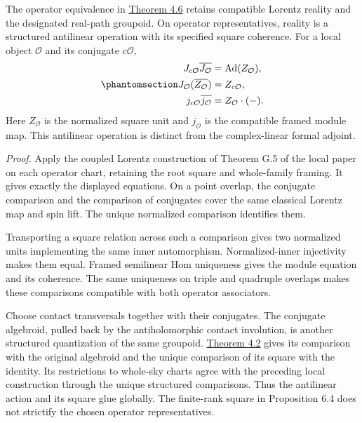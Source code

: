\documentclass[
  english,
  11pt,
  reqno]{amsart}
\begin{document}
The operator equivalence in
\hyperref[thm:operator-monodromy-equivalence]{Theorem 4.6} retains
compatible Lorentz reality and the designated real-path groupoid. On
operator representatives, reality is a structured antilinear operation
with its specified square coherence. For a local object \(\mathcal O\)
and its conjugate \(c\mathcal O\),
\begin{equation}\protect\phantomsection\label{eq:operator-monodromy-real-square}{
\begin{aligned}
J_{c\mathcal O}\overline{J_{\mathcal O}}
&=\operatorname{Ad}(Z_{\mathcal O}),\\
J_{\mathcal O}(\overline{Z_{\mathcal O}})
&=Z_{c\mathcal O},\\
j_{c\mathcal O}\overline{j_{\mathcal O}}
&=Z_{\mathcal O}\cdot(-).
\end{aligned}
}\end{equation} Here \(Z_{\mathcal O}\) is the normalized square unit
and \(j_{\mathcal O}\) is the compatible framed module map. This
antilinear operation is distinct from the complex-linear formal adjoint.

\emph{Proof.} Apply the coupled Lorentz construction of Theorem G.5 of
the local paper on each operator chart, retaining the root square and
whole-family framing. It gives exactly the displayed equations. On a
point overlap, the conjugate comparison and the comparison of conjugates
cover the same classical Lorentz map and spin lift. The unique
normalized comparison identifies them.

Transporting a square relation across such a comparison gives two
normalized units implementing the same inner automorphism.
Normalized-inner injectivity makes them equal. Framed semilinear Hom
uniqueness gives the module equation and its coherence. The same
uniqueness on triple and quadruple overlaps makes these comparisons
compatible with both operator associators.

Choose contact transversals together with their conjugates. The
conjugate algebroid, pulled back by the antiholomorphic contact
involution, is another structured quantization of the same groupoid.
\hyperref[thm:contact-groupoid-structured-quantization]{Theorem 4.2}
gives its comparison with the original algebroid and the unique
comparison of its square with the identity. Its restrictions to
whole-sky charts agree with the preceding local construction through the
unique structured comparisons. Thus the antilinear action and its square
glue globally. The finite-rank square in Proposition 6.4 does not
strictify the chosen operator representatives.
\end{document}
